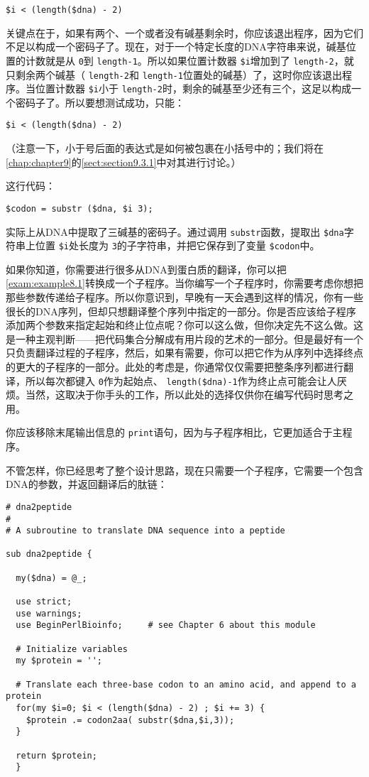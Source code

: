 \begin{lstlisting}
$i < (length($dna) - 2)
\end{lstlisting}

关键点在于，如果有两个、一个或者没有碱基剩余时，你应该退出程序，因为它们不足以构成一个密码子了。现在，对于一个特定长度的DNA字符串来说，碱基位置的计数就是从 \verb|0|到 \verb|length-1|。所以如果位置计数器 \verb|$i|增加到了 \verb|length-2|，就只剩余两个碱基（ \verb|length-2|和 \verb|length-1|位置处的碱基）了，这时你应该退出程序。当位置计数器 \verb|$i|小于 \verb|length-2|时，剩余的碱基至少还有三个，这足以构成一个密码子了。所以要想测试成功，只能：

\begin{lstlisting}
$i < (length($dna) - 2)
\end{lstlisting}

（注意一下，小于号后面的表达式是如何被包裹在小括号中的；我们将在\autoref{chap:chapter9}的\autoref{sect:section9.3.1}中对其进行讨论。）

这行代码：

\begin{lstlisting}
$codon = substr ($dna, $i 3);
\end{lstlisting}

实际上从DNA中提取了三碱基的密码子。通过调用 \verb|substr|函数，提取出 \verb|$dna|字符串上位置 \verb|$i|处长度为 \verb|3|的子字符串，并把它保存到了变量 \verb|$codon|中。

如果你知道，你需要进行很多从DNA到蛋白质的翻译，你可以把\autoref{exam:example8.1}转换成一个子程序。当你编写一个子程序时，你需要考虑你想把那些参数传递给子程序。所以你意识到，早晚有一天会遇到这样的情况，你有一些很长的DNA序列，但却只想翻译整个序列中指定的一部分。你是否应该给子程序添加两个参数来指定起始和终止位点呢？你可以这么做，但你决定先不这么做。这是一种主观判断——把代码集合分解成有用片段的艺术的一部分。但是最好有一个只负责翻译过程的子程序，然后，如果有需要，你可以把它作为从序列中选择终点的更大的子程序的一部分。此处的考虑是，你通常仅仅需要把整条序列都进行翻译，所以每次都键入 \verb|0|作为起始点、 \verb|length($dna)-1|作为终止点可能会让人厌烦。当然，这取决于你手头的工作，所以此处的选择仅供你在编写代码时思考之用。

你应该移除末尾输出信息的 \verb|print|语句，因为与子程序相比，它更加适合于主程序。

不管怎样，你已经思考了整个设计思路，现在只需要一个子程序，它需要一个包含DNA的参数，并返回翻译后的肽链：

\begin{lstlisting}
# dna2peptide 
#
# A subroutine to translate DNA sequence into a peptide

sub dna2peptide {
  
  my($dna) = @_;

  use strict;
  use warnings;
  use BeginPerlBioinfo;     # see Chapter 6 about this module

  # Initialize variables
  my $protein = '';

  # Translate each three-base codon to an amino acid, and append to a protein 
  for(my $i=0; $i < (length($dna) - 2) ; $i += 3) {
    $protein .= codon2aa( substr($dna,$i,3));
  }

  return $protein;
  }
\end{lstlisting}

